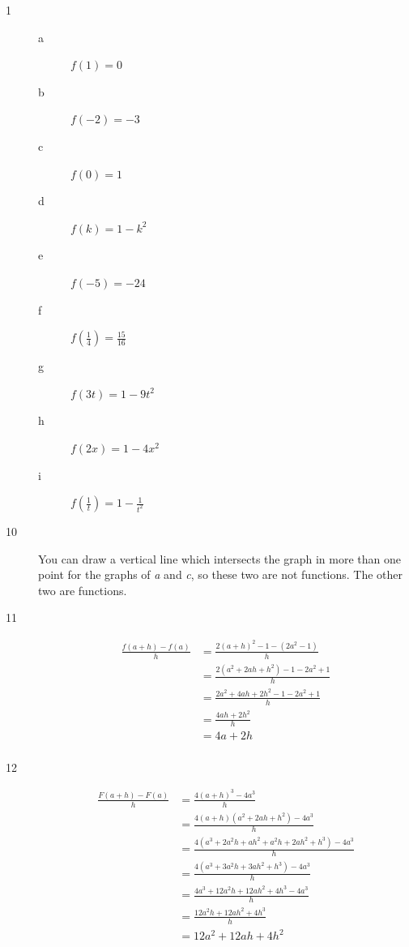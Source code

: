 \documentclass{exam}
\begin{document}
\begin{description}

\item[1]
\begin{description}
\item[a] $f(1) = 0$
\item[b] $f(-2) = -3$
\item[c] $f(0) = 1$
\item[d] $f(k) = 1 - k^2$
\item[e] $f(-5) = -24$
\item[f] $f\left(\frac{1}{4}\right) = \frac{15}{16}$
\item[g] $f(3t) = 1 - 9t^2$
\item[h] $f(2x) = 1 - 4x^2$
\item[i] $f \left( \frac{1}{t} \right) = 1 - \frac{1}{t^2}$
\end{description}

\item[10]
You can draw a vertical line which intersects the graph in more than one point for the graphs of {\em a} and {\em c}, so
these two are not functions.  The other two are functions. 

\item[11]
\begin{align*}
  \frac{f(a+h) - f(a)}{h} &= \frac{2(a+h)^2 - 1 - (2a^2 - 1)}{h} \\
                          &= \frac{2(a^2 + 2ah + h^2) - 1 - 2a^2 + 1}{h} \\
                          &= \frac{2a^2 + 4ah + 2h^2 - 1 - 2a^2 + 1}{h} \\
                          &= \frac{4ah + 2h^2}{h} \\
                          &= 4a + 2h \\
\end{align*}

\item[12]
\begin{align*}
  \frac{F(a+h) - F(a)}{h} &= \frac{4(a+h)^3 - 4a^3}{h} \\
                          &= \frac{4(a+h)(a^2 + 2ah + h^2) - 4a^3}{h} \\
                          &= \frac{4(a^3 + 2a^2h + ah^2 + a^2h + 2ah^2 + h^3) - 4a^3}{h} \\
                          &= \frac{4(a^3 + 3a^2h + 3ah^2 + h^3) - 4a^3}{h} \\
                          &= \frac{4a^3 + 12a^2h + 12ah^2 + 4h^3 - 4a^3}{h} \\
                          &= \frac{12a^2h + 12ah^2 + 4h^3}{h} \\
                          &= 12a^2 + 12ah + 4h^2 \\
\end{align*}


\end{description}
\end{document}
